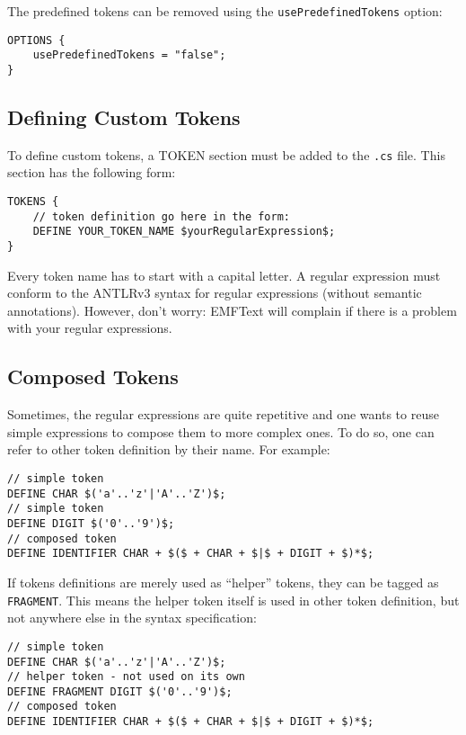 The predefined tokens can be removed using the \texttt{usePredefinedTokens}
option:

\begin{lstlisting}
OPTIONS {
    usePredefinedTokens = "false";
}
\end{lstlisting}

\subsection{Defining Custom Tokens}

To define custom tokens, a TOKEN section must be added to the \texttt{.cs} file.
This section has the following form:

\begin{lstlisting}
TOKENS {
    // token definition go here in the form:
    DEFINE YOUR_TOKEN_NAME $yourRegularExpression$;
}
\end{lstlisting}

Every token name has to start with a capital letter. A regular expression must
conform to the ANTLRv3 syntax for regular expressions (without semantic
annotations). However, don't worry: EMFText will complain if there is a problem
with your regular expressions.

\subsection{Composed Tokens}

Sometimes, the regular expressions are quite repetitive and one wants to reuse 
simple expressions to compose them to more complex ones. To do so, one can refer 
to other token definition by their name. For example:

\begin{lstlisting}
// simple token
DEFINE CHAR $('a'..'z'|'A'..'Z')$;
// simple token
DEFINE DIGIT $('0'..'9')$;
// composed token
DEFINE IDENTIFIER CHAR + $($ + CHAR + $|$ + DIGIT + $)*$;
\end{lstlisting}

If tokens definitions are merely used as ``helper'' tokens, they can be tagged
as \texttt{FRAGMENT}. This means the helper token itself is used in other token
definition, but not anywhere else in the syntax specification:

\begin{lstlisting}
// simple token
DEFINE CHAR $('a'..'z'|'A'..'Z')$;
// helper token - not used on its own
DEFINE FRAGMENT DIGIT $('0'..'9')$;
// composed token
DEFINE IDENTIFIER CHAR + $($ + CHAR + $|$ + DIGIT + $)*$;
\end{lstlisting}

